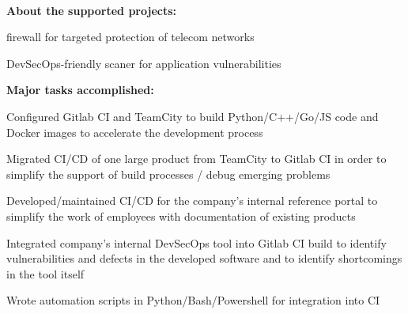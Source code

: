 \documentclass[a4paper]{MagicalCV}
\begin{document}
\begin{minipage}[t]{0.64\textwidth}
 \\
\vspace{\topsep} %
\textbf{About the supported projects:} 
\begin{tightemize}
  \item firewall for targeted protection of telecom networks
  \item DevSecOps-friendly scaner for application vulnerabilities
\end{tightemize}
\textbf{Major tasks accomplished:}
\begin{tightemize}
  \item Configured Gitlab CI and TeamCity to build Python/C++/Go/JS code and Docker images to accelerate the development process
  \item Migrated CI/CD of one large product from TeamCity to Gitlab CI in order to simplify the support of build processes / debug emerging problems
  \item Developed/maintained CI/CD for the company's internal reference portal to simplify the work of employees with documentation of existing products
  \item Integrated company's internal DevSecOps tool into Gitlab CI build to identify vulnerabilities and defects in the developed software and to identify shortcomings in the tool itself
  \item Wrote automation scripts in Python/Bash/Powershell for integration into CI
\end{tightemize}
\sectionsep

\end{minipage} 
\end{document}

